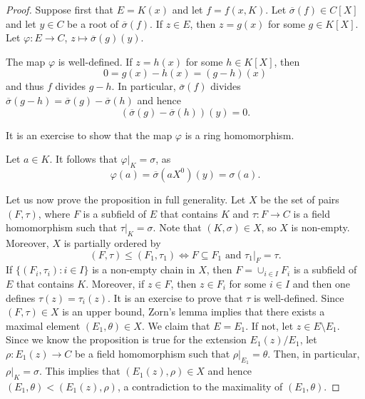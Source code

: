 \begin{proof}
	Suppose first that $E=K(x)$ and let $f=f(x,K)$. Let $\overline{\sigma}(f)\in C[X]$ 
	and let $y\in C$ be a root of $\overline{\sigma}(f)$. If $z\in E$, then $z=g(x)$ for
	some $g\in K[X]$. Let $\varphi\colon E\to C$, $z\mapsto \overline{\sigma}(g)(y)$. 

	The map $\varphi$ is well-defined. If $z=h(x)$ for some $h\in K[X]$, then
	\[
	0=g(x)-h(x)=(g-h)(x)
	\]
	and thus $f$ divides $g-h$. In particular, $\overline{\sigma}(f)$ divides
    $\overline{\sigma}(g-h)=\overline{\sigma}(g)-\overline{\sigma}(h)$ and hence
    \[
    (\overline{\sigma}(g)-\overline{\sigma}(h))(y)=0.
    \]

	It is an exercise to show that the map $\varphi$ is a ring homomorphism.
	
	Let $a\in K$. It follows that $\varphi|_K=\sigma$, as 
	\[
	\varphi(a)=\overline{\sigma}(aX^0)(y)=\sigma(a).
	\]
	
	Let us now prove the proposition in full generality. Let 
	$X$ be the set of pairs $(F,\tau)$, where $F$ is a subfield of $E$ that contains $K$ and
	$\tau\colon F\to C$ is a field homomorphism such that $\tau|_K=\sigma$. Note that
	$(K,\sigma)\in X$, so $X$ is non-empty. Moreover, $X$ is partially ordered by
	\[
	(F,\tau)\leq (F_1,\tau_1)\Longleftrightarrow F\subseteq F_1\text{ and }\tau_1|_F=\tau.
	\]
	If $\{(F_i,\tau_i):i\in I\}$ is a non-empty chain in $X$, then $F=\cup_{i\in I}F_i$ is a subfield of $E$
	that contains $K$. Moreover, if $z\in F$, then $z\in F_i$ for some $i\in I$ and 
	then one defines $\tau(z)=\tau_i(z)$. It is an exercise to prove that $\tau$ is well-defined.
	Since $(F,\tau)\in X$ is an upper bound, Zorn's lemma implies that there exists
	a maximal element 
	$(E_1,\theta)\in X$. We claim that $E=E_1$. If not, let $z\in E\setminus E_1$. 
	Since we know the proposition is true for the extension $E_1(z)/E_1$, 
	let  
	$\rho\colon E_1(z)\to C$ be a field homomorphism such that $\rho|_{E_1}=\theta$. Then, in particular, 
	$\rho|_K=\sigma$. This implies that $(E_1(z),\rho)\in X$ and hence
	$(E_1,\theta)<(E_1(z),\rho)$, a contradiction to the maximality of $(E_1,\theta)$. 
\end{proof}

